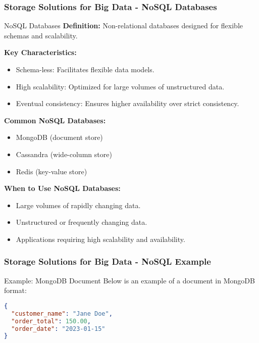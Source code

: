 \documentclass[aspectratio=169]{beamer}
\begin{document}
\begin{frame}[fragile]
    \frametitle{Storage Solutions for Big Data - NoSQL Databases}
    \begin{block}{NoSQL Databases}
        \textbf{Definition:} Non-relational databases designed for flexible schemas and scalability.
        
        \textbf{Key Characteristics:}
        \begin{itemize}
            \item Schema-less: Facilitates flexible data models.
            \item High scalability: Optimized for large volumes of unstructured data.
            \item Eventual consistency: Ensures higher availability over strict consistency.
        \end{itemize}
        
        \textbf{Common NoSQL Databases:}
        \begin{itemize}
            \item MongoDB (document store)
            \item Cassandra (wide-column store)
            \item Redis (key-value store)
        \end{itemize}
        
        \textbf{When to Use NoSQL Databases:}
        \begin{itemize}
            \item Large volumes of rapidly changing data.
            \item Unstructured or frequently changing data.
            \item Applications requiring high scalability and availability.
        \end{itemize}
    \end{block}
\end{frame}

\begin{frame}[fragile]
    \frametitle{Storage Solutions for Big Data - NoSQL Example}
    \begin{block}{Example: MongoDB Document}
        Below is an example of a document in MongoDB format:
        \begin{lstlisting}[language=json]
{
  "customer_name": "Jane Doe",
  "order_total": 150.00,
  "order_date": "2023-01-15"
}
        \end{lstlisting}
    \end{block}
\end{frame}
\end{document}
